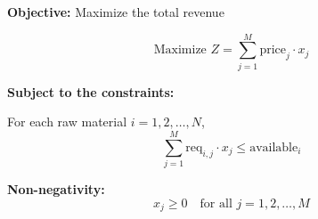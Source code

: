 \documentclass{article}
\begin{document}
\textbf{Objective:} Maximize the total revenue

\[
\text{Maximize } Z = \sum_{j=1}^{M} \text{price}_j \cdot x_j
\]

\textbf{Subject to the constraints:}

For each raw material \( i = 1, 2, \ldots, N \),
\[
\sum_{j=1}^{M} \text{req}_{i,j} \cdot x_j \leq \text{available}_i
\]

\textbf{Non-negativity:}
\[
x_j \geq 0 \quad \text{for all } j = 1, 2, \ldots, M
\]
\end{document}

